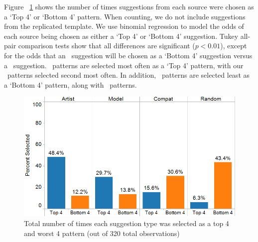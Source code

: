 Figure ~\ref{fig:study} shows the number of times suggestions from each source were chosen as a `Top 4' or `Bottom 4' pattern. When counting, we do not include suggestions from the replicated template. We use binomial regression to model the odds of each source being chosen as either a `Top 4' or `Bottom 4' suggestion. Tukey all-pair comparison tests show that all differences are significant ($p < 0.01$), except for the odds that an \artistSource~suggestion will be chosen as a `Bottom 4' suggestion versus a \modelSource~suggestion. \artistSource~patterns are selected most often as a `Top 4' pattern, with our \modelSource~patterns selected second most often. In addition, \modelSource~patterns are selected least as a `Bottom 4' pattern, along with \artistSource~patterns.





\begin{figure}[h!]
  \begin{center}
  \includegraphics[width=\columnwidth]{figs/evaluation.png}
	\end{center}
\caption{Total number of times each suggestion type was selected as a top 4 and worst 4 pattern (out of 320 total observations)~}

 \label{fig:study}
\end{figure}

